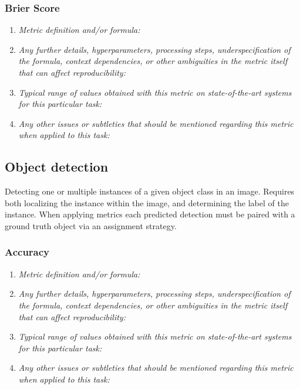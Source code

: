 \documentclass[a4paper,11pt]{article}
\begin{document}
        \subsubsection{Brier Score}
            \begin{enumerate}[label=\alph*.]
                \item \textit{Metric definition and/or formula:}
                \bigskip
                \item \textit{Any further details, hyperparameters, processing steps, underspecification of the formula, context dependencies, or other ambiguities in the metric itself that can affect reproducibility:}
                \bigskip
                \item \textit{Typical range of values obtained with this metric on state-of-the-art systems for this particular task:}
                \bigskip
                \item \textit{Any other issues or subtleties that should be mentioned regarding this metric when applied to this task:}
                \bigskip
            \end{enumerate}


    \subsection{Object detection}
        Detecting one or multiple instances of a given object class in an image. Requires both localizing the instance within the image, and determining the label of the instance. When applying metrics each predicted detection must be paired with a ground truth object via an assignment strategy. 

        \subsubsection{Accuracy}
            \begin{enumerate}[label=\alph*.]
                \item \textit{Metric definition and/or formula:}
                \bigskip
                \item \textit{Any further details, hyperparameters, processing steps, underspecification of the formula, context dependencies, or other ambiguities in the metric itself that can affect reproducibility:}
                \bigskip
                \item \textit{Typical range of values obtained with this metric on state-of-the-art systems for this particular task:}
                \bigskip
                \item \textit{Any other issues or subtleties that should be mentioned regarding this metric when applied to this task:}
                \bigskip
            \end{enumerate}
\end{document}
